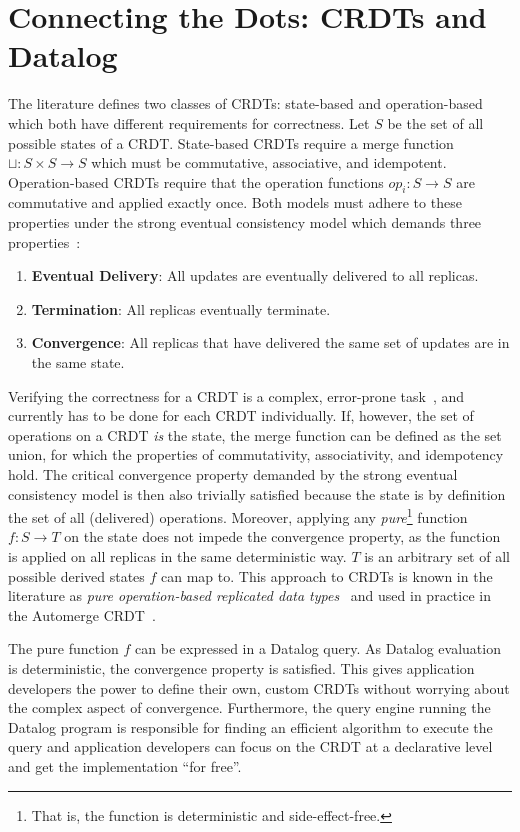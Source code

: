 \documentclass{article}
\begin{document}
\section{Connecting the Dots: CRDTs and Datalog}
\label{sec:crdts_datalog}

The literature defines two classes of CRDTs: state-based and operation-based
which both have different requirements for correctness.
Let \( S \) be the set of all possible states of a CRDT.
State-based CRDTs require a merge function \( \sqcup: S \times S \to S \)
which must be commutative, associative, and idempotent.
Operation-based CRDTs require that the operation functions \( op_i: S \to S \)
are commutative and applied exactly once.
Both models must adhere to these properties under the strong eventual consistency
model which demands three properties~\cite{shapiro2011comprehensive}:

\begin{enumerate}
	\item \textbf{Eventual Delivery}: All updates are eventually delivered to all replicas.
	\item \textbf{Termination}: All replicas eventually terminate.
	\item \textbf{Convergence}: All replicas that have delivered the same set of updates are in the same state.
\end{enumerate}

Verifying the correctness for a CRDT is a complex,
error-prone task~\cite{gomes2017verifying, kleppmann2022assessing},
and currently has to be done for each CRDT individually.
If, however, the set of operations on a CRDT \emph{is} the state,
the merge function can be defined as the set union,
for which the properties of commutativity, associativity, and idempotency hold.
The critical convergence property demanded by the strong eventual consistency
model is then also trivially satisfied because the state is by definition
the set of all (delivered) operations.
Moreover, applying any \emph{pure}\footnote{
	That is, the function is deterministic and side-effect-free.
}
function \( f: S \to T \) on the state does not impede the convergence property,
as the function is applied on all replicas in the same deterministic way.
\( T \) is an arbitrary set of all possible derived states \( f \) can map to.
This approach to CRDTs is known in the literature as
\emph{pure operation-based replicated data types}~\cite{baquero2017pure, stewen2024undo}
and used in practice in the Automerge CRDT~\cite{automerge}.

The pure function \( f \) can be expressed in a Datalog query.
As Datalog evaluation is deterministic, the convergence property is satisfied.
This gives application developers the power to define their own, custom CRDTs
without worrying about the complex aspect of convergence.
Furthermore, the query engine running the Datalog program is responsible
for finding an efficient algorithm to execute the query and application developers
can focus on the CRDT at a declarative level and get the implementation ``for free''.
\end{document}
